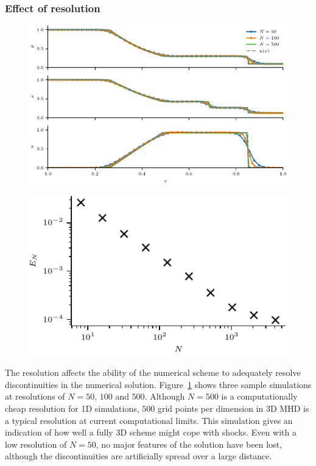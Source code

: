 \subsubsection{Effect of resolution}

\begin{figure}[t]
  \centering
  \includegraphics[width=1.0\linewidth]{resolution_study.pdf}
  \label{fig:resolution_study}
\end{figure}

\begin{figure}[t]
  \centering
  \includegraphics[width=0.5\linewidth]{effect_of_res_on_error.pdf}
  \label{fig:effect_of_res_on_error}
\end{figure}

The resolution affects the ability of the numerical scheme to adequately resolve discontinuities in the numerical solution. Figure~\ref{fig:resolution_study} shows three sample simulations at resolutions of $N=50$, $100$ and $500$. Although $N=500$ is a computationally cheap resolution for 1D simulations, $500$ grid points per dimension in 3D MHD is a typical resolution at current computational limits. This simulation gives an indication of how well a fully 3D scheme might cope with shocks. Even with a low resolution of $N=50$, no major features of the solution have been lost, although the discontinuities are artificially spread over a large distance.

